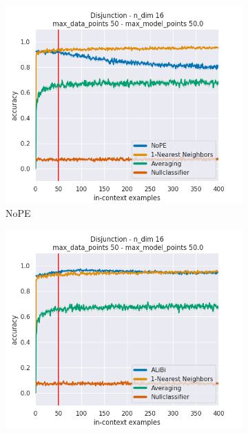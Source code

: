 \documentclass[letterpaper]{article} %
\begin{document}
\begin{figure}[tp]
\begin{subfigure}[t]{0.24\linewidth}
    \end{subfigure}
    \\
    \begin{subfigure}[t]{0.24\linewidth}
        \includegraphics[width=\linewidth]{AnonymousSubmission/LaTeX/imgs/experiments/disjunction/nope.png}
        \caption{NoPE}
    \end{subfigure}
    \begin{subfigure}[t]{0.24\linewidth}
        \includegraphics[width=\linewidth]{AnonymousSubmission/LaTeX/imgs/experiments/disjunction/alibi.png}

\end{subfigure}
\end{figure}
\end{document}
